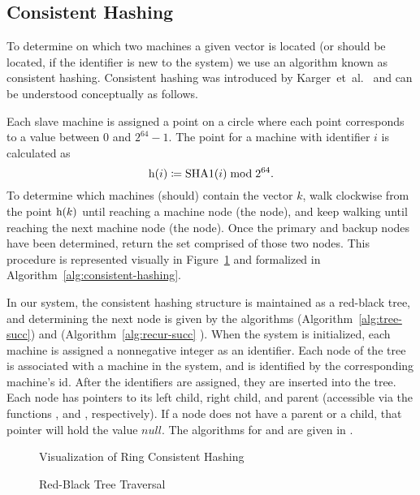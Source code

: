 \subsection{Consistent Hashing}
To determine on which two machines a given vector is located (or should be
located, if the identifier is new to the system) we use an algorithm known as
consistent hashing. Consistent hashing was introduced by
Karger~et~al.~\cite{karger1997} and can be understood conceptually as follows.
\par
Each slave machine is assigned a point on a circle where each point corresponds
to a value between \(0\) and \(2^{64} - 1\). The point for a machine with
identifier \(i\) is calculated as
\begin{equation*}
    \mathrm{h}(i) \coloneqq \mathrm{SHA1}(i) \bmod{2^{64}}.
\end{equation*}
To determine which machines (should) contain the vector \(k\), walk clockwise
from the point \(\mathrm{h}(k)\) until reaching a machine node (the
 node), and keep walking until reaching the next machine node
(the  node). Once the primary and backup nodes have been
determined, return the set comprised of those two nodes. This procedure is
represented visually in Figure~\ref{fig:ring-hash-process} and formalized in
Algorithm~\ref{alg:consistent-hashing}.
%
\par
In our system, the consistent hashing structure is maintained as a red-black
tree, and determining the next node is given by the algorithms
 (Algorithm~\ref{alg:tree-succ}) and
 (Algorithm~\ref{alg:recur-succ}
\cite{bstPredecessorSuccessor}). When the system is initialized, each machine
is assigned a nonnegative integer as an identifier. Each node of the tree is
associated with a machine in the system, and is identified by the corresponding
machine's id. After the identifiers are assigned, they are inserted into the
tree. Each node has pointers to its left child, right child, and parent
(accessible via the functions ,  and
, respectively). If a node does not have a parent or a child,
that pointer will hold the value \(null\). The algorithms for
 and  are given in \cite{cormen2009}.
%
\begin{figure}
    \centering
    
    \caption{Visualization of Ring Consistent Hashing}
    \label{fig:ring-hash-process}
\end{figure}
%
\begin{figure}
    \centering
    
    \caption{Red-Black Tree Traversal}
    \label{fig:tree-traversal}
\end{figure}
